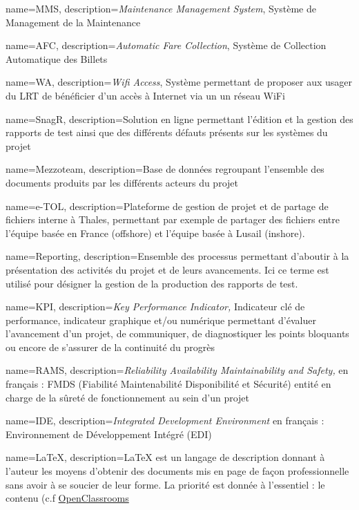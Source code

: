 {
	name=MMS,
	description={\textit{Maintenance Management System}, Système de Management de la Maintenance}
}

{
	name=AFC,
	description={\textit{Automatic Fare Collection}, Système de Collection Automatique des Billets}
}

{
	name=WA,
	description={\textit{Wifi Access}, Système permettant de proposer aux usager du LRT de bénéficier d'un accès à Internet via un un réseau WiFi}
}

{
	name=SnagR,
	description={Solution en ligne permettant l'édition et la gestion des rapports de test ainsi que des différents défauts présents sur les systèmes du projet }
}


{
	name=Mezzoteam,
	description={Base de données regroupant l'ensemble des documents produits par les différents acteurs du projet}
}

{
	name=e-TOL,
	description={Plateforme de gestion de projet et de partage de fichiers interne à Thales, permettant par exemple de partager des fichiers entre l'équipe basée en France (offshore) et l'équipe basée à Lusail (inshore).}
}

{
	name=Reporting,
	description={Ensemble des processus permettant d'aboutir à la présentation des activités du projet et de leurs avancements. Ici ce terme est utilisé pour désigner la gestion de la production des rapports de test.}
}

{
	name=KPI,
	description={\textit{Key Performance Indicator,} Indicateur clé de performance, indicateur graphique et/ou numérique permettant d'évaluer l'avancement d'un projet, de communiquer, de diagnostiquer les points bloquants ou encore de s'assurer de la continuité du progrès}
}

{
	name=RAMS,
	description={\textit{Reliability Availability Maintainability and Safety,} en français : FMDS (Fiabilité Maintenabilité Disponibilité et Sécurité) entité en charge de la sûreté de fonctionnement au sein d'un projet}
}

{
	name=IDE,
	description={\textit{Integrated Development Environment} en français :  Environnement de Développement Intégré (EDI) }
}

{
	name=LaTeX,
	description={LaTeX est un langage de description donnant à l'auteur les moyens d'obtenir des documents mis en page de façon professionnelle sans avoir à se soucier de leur forme. La priorité est donnée à l'essentiel : le contenu (c.f \href{https://openclassrooms.com/fr/courses/1617396-redigez-des-documents-de-qualite-avec-latex/1617565-quest-ce-que-latex}{OpenClassrooms}}
}

